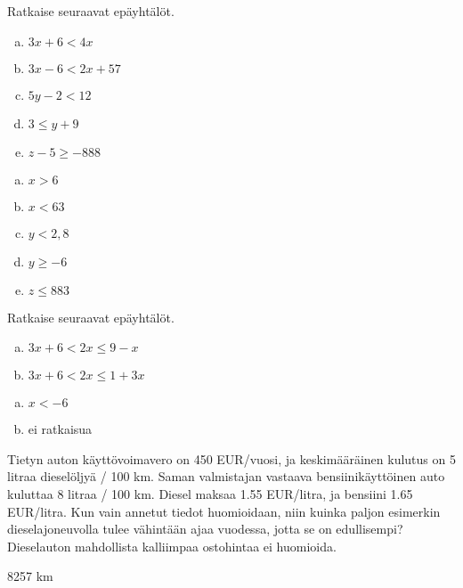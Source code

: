\begin{tehtava}
    Ratkaise seuraavat epäyhtälöt.
    \begin{enumerate}[a)]
        \item $3x+6<4x$
        \item $3x-6<2x+57$
        \item $5y-2<12$
        \item $3\leq y+9$
        \item $z-5\geq-888$
    \end{enumerate}
    \begin{vastaus}
        \begin{enumerate}[a)]
            \item $x>6$
            \item $x<63$
            \item $y<2,8$
            \item $y\geq -6$
            \item $z\leq 883$
        \end{enumerate}
    \end{vastaus}
\end{tehtava}

\begin{tehtava}
    Ratkaise seuraavat epäyhtälöt.
    \begin{enumerate}[a)]
        \item $3x+6<2x\leq 9-x$
        \item $3x+6<2x\leq 1+3x$
    \end{enumerate}
    \begin{vastaus}
        \begin{enumerate}[a)]
            \item $x<-6$
            \item ei ratkaisua
        \end{enumerate}
    \end{vastaus}
\end{tehtava}

\begin{tehtava}
	Tietyn auton käyttövoimavero on 450 EUR/vuosi, ja keskimääräinen kulutus on 5 litraa dieselöljyä / 100 km. Saman valmistajan vastaava bensiinikäyttöinen auto kuluttaa 8 litraa / 100 km. Diesel maksaa 1.55 EUR/litra, ja bensiini 1.65 EUR/litra. Kun vain annetut tiedot huomioidaan, niin kuinka paljon esimerkin dieselajoneuvolla tulee vähintään ajaa vuodessa, jotta se on edullisempi? Dieselauton mahdollista kalliimpaa ostohintaa ei huomioida.
    \begin{vastaus}
        \item 8257 km
    \end{vastaus}
\end{tehtava}
